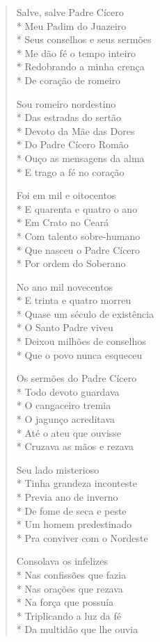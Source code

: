 \begin{verse}
Salve, salve Padre Cícero\\*
Meu Padim do Juazeiro\\*
Seus conselhos e seus sermões\\*
Me dão fé o tempo inteiro\\*
Redobrando a minha crença\\*
De coração de romeiro

Sou romeiro nordestino\\*
Das estradas do sertão\\*
Devoto da Mãe das Dores\\*
Do Padre Cícero Romão\\*
Ouço as mensagens da alma\\*
E trago a fé no coração

Foi em mil e oitocentos\\*
E quarenta e quatro o ano\\*
Em Crato no Ceará\\*
Com talento sobre-humano\\*
Que nasceu o Padre Cícero\\*
Por ordem do Soberano

No ano mil novecentos\\*
E trinta e quatro morreu\\*
Quase um século de existência\\*
O Santo Padre viveu\\*
Deixou milhões de conselhos\\*
Que o povo nunca esqueceu

Os sermões do Padre Cícero\\*
Todo devoto guardava\\*
O cangaceiro tremia\\*
O jagunço acreditava\\*
Até o ateu que ouvisse\\*
Cruzava as mãos e rezava

Seu lado misterioso\\*
Tinha grandeza inconteste\\*
Previa ano de inverno\\*
De fome de seca e peste\\*
Um homem predestinado\\*
Pra conviver com o Nordeste

Consolava os infelizes\\*
Nas confissões que fazia\\*
Nas orações que rezava\\*
Na força que possuía\\*
Triplicando a luz da fé\\*
Da multidão que lhe ouvia


\end{verse}
